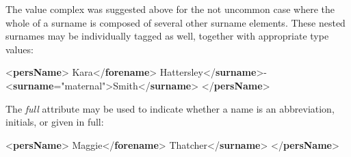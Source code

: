 The value complex was suggested above for the not uncommon case where the whole of a surname is composed of several other surname elements. These nested surnames may be individually tagged as well, together with appropriate type values: \par\bgroup{}\exampleFont \begin{shaded}\noindent\mbox{}{<\textbf{persName}>}\mbox{}\newline 
{}Kara{</\textbf{forename}>}\mbox{}\newline 
{}\mbox{}\newline 
\hspace*{1em}Hattersley{</\textbf{surname}>}- {<\textbf{surname}\hspace*{1em}{type}="{maternal}">}Smith{</\textbf{surname}>}\mbox{}\newline 
{}\mbox{}\newline 
{</\textbf{persName}>}\end{shaded}\egroup\par \par
The {\itshape full} attribute may be used to indicate whether a name is an abbreviation, initials, or given in full: \par\bgroup{}\exampleFont \begin{shaded}\noindent\mbox{}{<\textbf{persName}>}\mbox{}\newline 
{}Maggie{</\textbf{forename}>}\mbox{}\newline 
{}Thatcher{</\textbf{surname}>}\mbox{}\newline 
{</\textbf{persName}>}\end{shaded}\egroup\par \par
